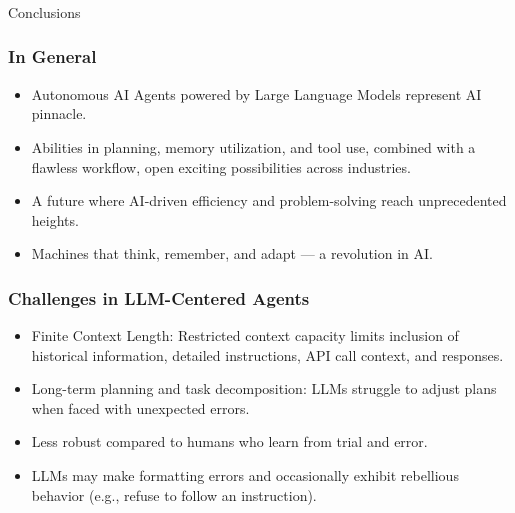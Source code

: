 \begin{frame}[fragile]\frametitle{}
\begin{center}
{\Large Conclusions}
\end{center}
\end{frame}

\begin{frame}[fragile]\frametitle{In General}
  \begin{itemize}
    \item Autonomous AI Agents powered by Large Language Models represent AI pinnacle.
    \item Abilities in planning, memory utilization, and tool use, combined with a flawless workflow, open exciting possibilities across industries.
    \item A future where AI-driven efficiency and problem-solving reach unprecedented heights.
    \item Machines that think, remember, and adapt — a revolution in AI.
  \end{itemize}
\end{frame}


\begin{frame}[fragile]\frametitle{Challenges in LLM-Centered Agents}
  \begin{itemize}

    \item Finite Context Length: Restricted context capacity limits inclusion of historical information, detailed instructions, API call context, and responses.
    \item Long-term planning and task decomposition: LLMs struggle to adjust plans when faced with unexpected errors.
    \item Less robust compared to humans who learn from trial and error.
    \item LLMs may make formatting errors and occasionally exhibit rebellious behavior (e.g., refuse to follow an instruction).
  \end{itemize}
\end{frame}

